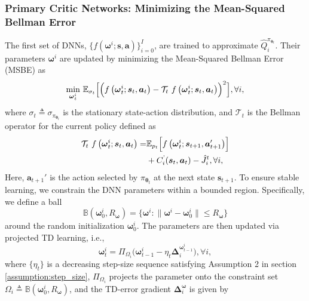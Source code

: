 \documentclass{IEEEtran}
\begin{document}
\subsubsection{Primary Critic Networks: Minimizing the Mean-Squared Bellman Error}
The first set of DNNs, $\{f(\boldsymbol{\omega}^{i};\boldsymbol{s},\boldsymbol{a})\}_{i=0}^{I}$, are trained to approximate $\hat{Q}_{i}^{\pi_{\boldsymbol{\theta}_{t}}}$. Their parameters $\boldsymbol{\omega}^{i}$ are updated by minimizing the Mean-Squared Bellman Error (MSBE) as
\begin{equation}
\underset{\boldsymbol{\omega}_{t}^{i}}{\mathrm{min}}\ \mathbb{E}_{\sigma_{t}}\Bigl[\Bigl(f\left(\boldsymbol{\omega}_{t}^{i};\boldsymbol{s}_{t},\boldsymbol{a}_{t}\right)-\mathcal{T}_{t}\ f\left(\boldsymbol{\omega}_{t}^{i};\boldsymbol{s}_{t},\boldsymbol{a}_{t}\right)\Bigr)^{2}\Bigr],\forall i,\label{eq:MSBE}
\end{equation}
where $\sigma_{t}\triangleq\sigma_{\pi_{\boldsymbol{\theta}_{t}}}$ is the stationary state-action distribution, and $\mathcal{T}_{t}$ is the Bellman operator for the current policy defined as
\begin{align}
\mathcal{T}_{t}\ f\left(\boldsymbol{\omega}_{t}^{i};\boldsymbol{s}_{t},\boldsymbol{a}_{t}\right)= & \mathbb{E}_{p_{t}}\Bigl[f\left(\boldsymbol{\omega}_{t}^{i};\boldsymbol{s}_{t+1},\boldsymbol{a}_{t+1}'\right)\Bigr]\\
& +C_{i}^{\text{'}}(\boldsymbol{s}_{t},\boldsymbol{a}_{t})-\hat{J}_{i}^{t},\forall i,\nonumber
\end{align}
Here, $\boldsymbol{a}_{t+1}'$ is the action selected by $\pi_{\boldsymbol{\theta}_{t}}$ at the next state $\boldsymbol{s}_{t+1}$. To ensure stable learning, we constrain the DNN parameters within a bounded region. Specifically, we define a ball
\[
\mathbb{B}(\boldsymbol{\omega}_{0}^{i},R_{\boldsymbol{\omega}})=\{\boldsymbol{\omega}^{i}:\|\boldsymbol{\omega}^{i}-\boldsymbol{\omega}_{0}^{i}\|\leq R_{\boldsymbol{\omega}}\}
\]
around the random initialization $\boldsymbol{\omega}_{0}^{i}$. The parameters are then updated via projected TD learning, i.e.,
\begin{equation}
\boldsymbol{\omega}_{t}^{i}=\Pi_{\Omega_{i}}\bigl(\boldsymbol{\omega}_{t-1}^{i}-\eta_{t}\boldsymbol{\Delta}_{i}^{\boldsymbol{\omega}_{t-1}^{i}}\bigr),\forall i,\label{eq:TD-learning}
\end{equation}
where $\{\eta_{t}\}$ is a decreasing step-size sequence satisfying Assumption 2 in section \ref{assumption:step_size}, $\Pi_{\Omega_{i}}$ projects the parameter onto the constraint set $\Omega_{i}\triangleq\mathbb{B}(\boldsymbol{\omega}_{0}^{i},R_{\boldsymbol{\omega}})$, and the TD-error gradient $\boldsymbol{\Delta}_{i}^{\boldsymbol{\omega}}$ is given by
\end{document}
